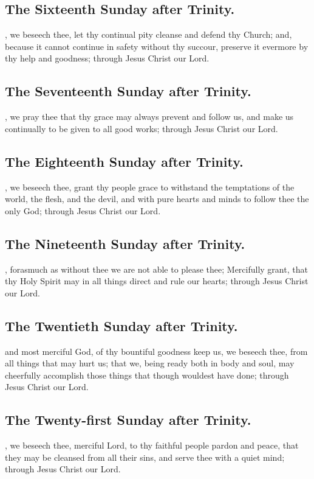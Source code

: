 \subsection{The Sixteenth Sunday after Trinity.}
, we beseech thee, let thy continual pity cleanse and defend thy Church; and, because it cannot continue in safety without thy succour, preserve it evermore by thy help and goodness; through Jesus Christ our Lord.

\subsection{The Seventeenth Sunday after Trinity.}
, we pray thee that thy grace may always prevent and follow us, and make us continually to be given to all good works; through Jesus Christ our Lord.

\subsection{The Eighteenth Sunday after Trinity.}
, we beseech thee, grant thy people grace to withstand the temptations of the world, the flesh, and the devil, and with pure hearts and minds to follow thee the only God; through Jesus Christ our Lord.

\subsection{The Nineteenth Sunday after Trinity.}
, forasmuch as without thee we are not able to please thee; Mercifully grant, that thy Holy Spirit may in all things direct and rule our hearts; through Jesus Christ our Lord.

\subsection{The Twentieth Sunday after Trinity.}
 and most merciful God, of thy bountiful goodness keep us, we beseech thee, from all things that may hurt us; that we, being ready both in body and soul, may cheerfully accomplish those things that though wouldest have done; through Jesus Christ our Lord.

\subsection{The Twenty-first Sunday after Trinity.}
, we beseech thee, merciful Lord, to thy faithful people pardon and peace, that they may be cleansed from all their sins, and serve thee with a quiet mind; through Jesus Christ our Lord.

